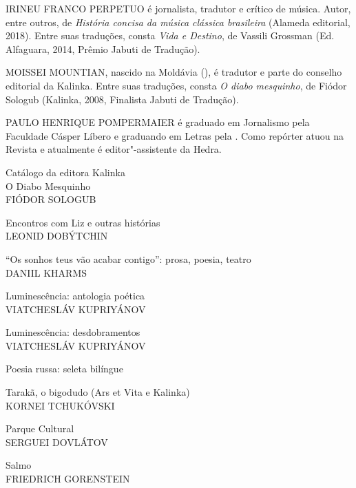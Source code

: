 \medskip

\noindent{}IRINEU FRANCO PERPETUO é jornalista, tradutor e crítico de música. Autor, entre outros, de \emph{História concisa da música clássica brasileira} (Alameda editorial, 2018). Entre suas traduções, consta \emph{Vida e Destino}, de Vassili Grossman (Ed. Alfaguara, 2014, Prêmio Jabuti de Tradução).

\medskip

\noindent{}MOISSEI MOUNTIAN, nascido na Moldávia (\scalebox{0.8}{URSS}), é tradutor e parte do conselho editorial da Kalinka. Entre suas traduções, consta \emph{O diabo mesquinho}, de Fiódor Sologub (Kalinka, 2008, Finalista Jabuti de Tradução).
 
\medskip

\noindent{}PAULO HENRIQUE POMPERMAIER é graduado em Jornalismo pela Faculdade Cásper Líbero e graduando em Letras pela \scalebox{0.8}{USP}. Como repórter atuou na Revista  e atualmente é editor"-assistente da Hedra.

\afterpage{\blankpage}

\newpage
\pagestyle{empty}
\MyriadPro

\noindent{}Catálogo da editora Kalinka\\[5pt]

\noindent{}O Diabo Mesquinho\\
FIÓDOR SOLOGUB
\medskip

\noindent{}Encontros com Liz e outras histórias\\
LEONID DOBÝTCHIN
\medskip

\noindent{}``Os sonhos teus vão acabar contigo'': prosa, poesia, teatro\\
DANIIL KHARMS
\medskip

\noindent{}Luminescência: antologia poética\\
VIATCHESLÁV KUPRIYÁNOV
\medskip

\noindent{}Luminescência: desdobramentos\\
VIATCHESLÁV KUPRIYÁNOV
\medskip

\noindent{}Poesia russa: seleta bilíngue
\medskip

\noindent{}Tarakã, o bigodudo (Ars et Vita e Kalinka)\\
KORNEI TCHUKÓVSKI
\medskip

\noindent{}Parque Cultural\\
SERGUEI DOVLÁTOV
\medskip

\noindent{}Salmo\\
FRIEDRICH GORENSTEIN
\medskip

